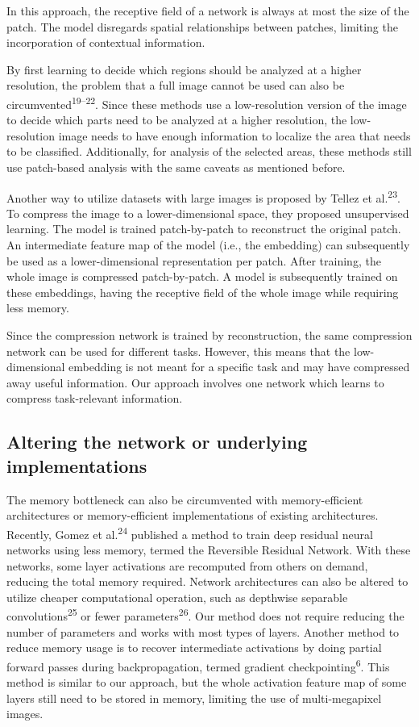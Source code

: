 \documentclass[
  12pt,
  a5,margin=2cmpaper,
]{article}
\begin{document}
In this approach, the receptive field of a network is always at most the
size of the patch. The model disregards spatial relationships between
patches, limiting the incorporation of contextual information.

By first learning to decide which regions should be analyzed at a higher
resolution, the problem that a full image cannot be used can also be
circumvented\textsuperscript{19--22}. Since these methods use a
low-resolution version of the image to decide which parts need to be
analyzed at a higher resolution, the low-resolution image needs to have
enough information to localize the area that needs to be classified.
Additionally, for analysis of the selected areas, these methods still
use patch-based analysis with the same caveats as mentioned before.

Another way to utilize datasets with large images is proposed by Tellez
et al.\textsuperscript{23}. To compress the image to a lower-dimensional
space, they proposed unsupervised learning. The model is trained
patch-by-patch to reconstruct the original patch. An intermediate
feature map of the model (i.e., the embedding) can subsequently be used
as a lower-dimensional representation per patch. After training, the
whole image is compressed patch-by-patch. A model is subsequently
trained on these embeddings, having the receptive field of the whole
image while requiring less memory.

Since the compression network is trained by reconstruction, the same
compression network can be used for different tasks. However, this means
that the low-dimensional embedding is not meant for a specific task and
may have compressed away useful information. Our approach involves one
network which learns to compress task-relevant information.

\hypertarget{altering-the-network-or-underlying-implementations}{%
\subsection{Altering the network or underlying
implementations}\label{altering-the-network-or-underlying-implementations}}

The memory bottleneck can also be circumvented with memory-efficient
architectures or memory-efficient implementations of existing
architectures. Recently, Gomez et al.\textsuperscript{24} published a
method to train deep residual neural networks using less memory, termed
the Reversible Residual Network. With these networks, some layer
activations are recomputed from others on demand, reducing the total
memory required. Network architectures can also be altered to utilize
cheaper computational operation, such as depthwise separable
convolutions\textsuperscript{25} or fewer
parameters\textsuperscript{26}. Our method does not require reducing the
number of parameters and works with most types of layers. Another method
to reduce memory usage is to recover intermediate activations by doing
partial forward passes during backpropagation, termed gradient
checkpointing\textsuperscript{6}. This method is similar to our
approach, but the whole activation feature map of some layers still need
to be stored in memory, limiting the use of multi-megapixel images.
\end{document}
